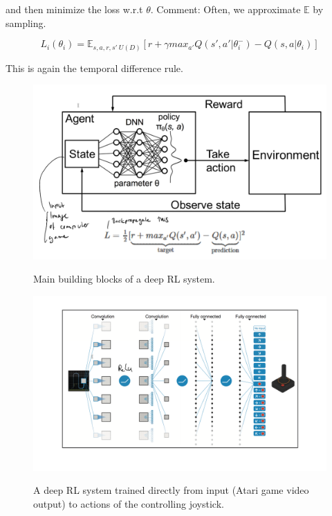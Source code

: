 \documentclass[main]{subfiles}
\begin{document}
and then minimize the loss w.r.t $\theta$. Comment: Often, we approximate $\mathbb{E}$ by sampling.

\begin{equation}
    L_i(\theta_i) = \mathbb{E}_{s,a,r,s'~U(D)} [r+ \gamma max_{a'}Q(s',a'|\theta_i^-) - Q(s,a|\theta_i)]
\end{equation}

This is again the temporal difference rule.

\begin{figure}[H]
	\centering
	\includegraphics[width=0.9\linewidth]{08_ReinforcementLearning/figures/deep-rl-1.png}
	\label{fig:rl-basic-comps}
	\caption{Main building blocks of a deep RL system.}
\end{figure}

\begin{figure}[H]
	\centering
	\includegraphics[width=0.9\linewidth]{08_ReinforcementLearning/figures/deep-rl-example.png}
	\label{fig:deep-rl-example}
	\caption{A deep RL system trained directly from input (Atari game video output) to actions of the controlling joystick.}
\end{figure}
\end{document}
